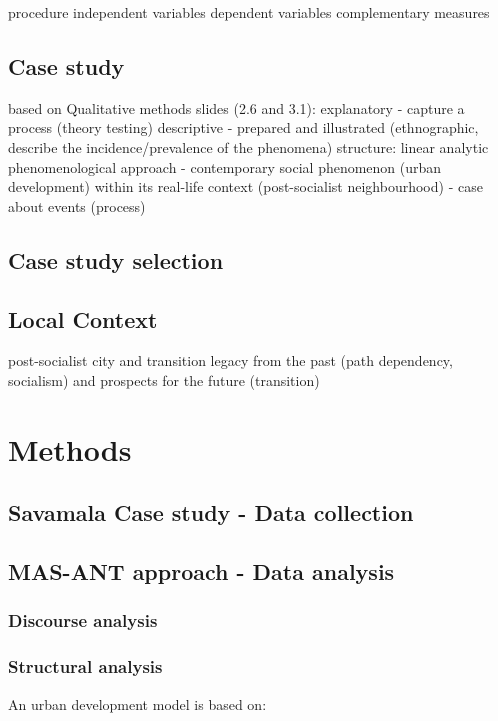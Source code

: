 \documentclass[11pt]{report}
\begin{document}
procedure
independent variables
dependent variables
complementary measures

\subsection{Case study}

based on Qualitative methods slides (2.6 and 3.1):
explanatory - capture a process (theory testing)
descriptive - prepared and illustrated (ethnographic, describe the incidence/prevalence of the phenomena)
structure: linear analytic
phenomenological approach - contemporary social phenomenon (urban development) within its real-life context (post-socialist neighbourhood) - case about events (process)


\subsection{Case study selection}
\subsection{Local Context}

post-socialist city and transition
legacy from the past (path dependency, socialism) and prospects for the future (transition)

\section{Methods}

\subsection{Savamala Case study - Data collection} \label{sec:predis}

\subsection{MAS-ANT approach - Data analysis}

\subsubsection{Discourse analysis}
\subsubsection{Structural analysis}

An urban development model is based on:
\end{document}
